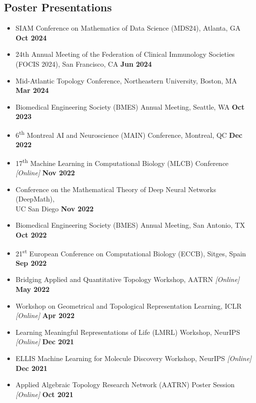\documentclass[margin,line]{res}
\begin{document}
\begin{resume}
\section{\sc Poster Presentations}
{\renewcommand\leftmargini{0em}
\begin{itemize}
\setlength\itemsep{0.3em}
\item[] SIAM Conference on Mathematics of Data Science (MDS24), Atlanta, GA \hfill {\bf \small Oct 2024}
\item[] 24th Annual Meeting of the Federation of Clinical Immunology Societies \\ (FOCIS 2024), San Francisco, CA \hfill {\bf \small Jun 2024}
\item[] Mid-Atlantic Topology Conference, Northeastern University, Boston, MA \hfill {\bf \small Mar 2024}
\item[] Biomedical Engineering Society (BMES) Annual Meeting, Seattle, WA \hfill {\bf \small  Oct 2023}
\item[] 6\textsuperscript{th} Montreal AI and Neuroscience (MAIN) Conference, Montreal, QC \hfill {\bf \small  Dec 2022}
\item[] 17\textsuperscript{th} Machine Learning in Computational Biology (MLCB) Conference \textit{[Online]} \hfill {\bf \small  Nov 2022}
\item[] Conference on the Mathematical Theory of Deep Neural Networks (DeepMath), \\ UC San Diego \hfill {\bf \small  Nov 2022}
\item[] Biomedical Engineering Society (BMES) Annual Meeting, San Antonio, TX \hfill {\bf \small  Oct 2022}
\item[] 21\textsuperscript{st} European Conference on Computational Biology (ECCB), Sitges, Spain \hfill {\bf \small  Sep 2022}
\item[] Bridging Applied and Quantitative Topology Workshop, AATRN \textit{[Online]} \hfill {\bf \small  May 2022}
\item[] Workshop on Geometrical and Topological Representation Learning, ICLR \textit{[Online]} \hfill {\bf \small  Apr 2022} 
\item[] Learning Meaningful Representations of Life (LMRL) Workshop, NeurIPS \textit{[Online]} \hfill {\bf \small  Dec 2021}
\item[] ELLIS Machine Learning for Molecule Discovery Workshop, NeurIPS \textit{[Online]} \hfill {\bf \small  Dec 2021}
\item[] Applied Algebraic Topology Research Network (AATRN) Poster Session \textit{[Online]} \hfill {\bf \small  Oct 2021}

\end{itemize}}
\end{resume}
\end{document}
